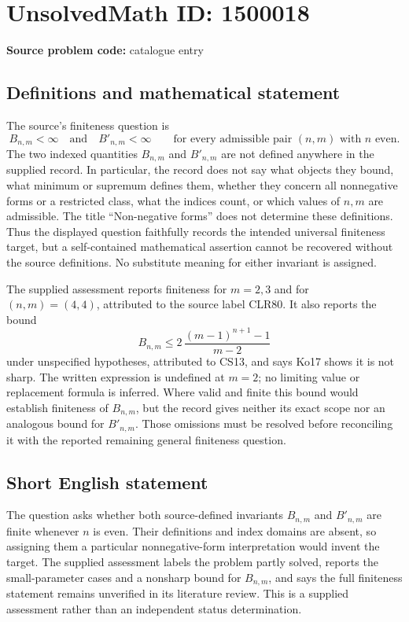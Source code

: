 \documentclass[11pt]{article}
\begin{document}
\section*{UnsolvedMath ID: 1500018}
\textbf{Source problem code:} catalogue entry
\subsection{Definitions and mathematical statement}
The source's finiteness question is
\[
 B_{n,m}<\infty\quad\text{and}\quad B'_{n,m}<\infty
 \qquad\text{for every admissible pair }(n,m)\text{ with }n\text{ even}.
\]
The two indexed quantities $B_{n,m}$ and $B'_{n,m}$ are not defined anywhere in the supplied record. In particular, the record does not say what objects they bound, what minimum or supremum defines them, whether they concern all nonnegative forms or a restricted class, what the indices count, or which values of $n,m$ are admissible. The title ``Non-negative forms'' does not determine these definitions. Thus the displayed question faithfully records the intended universal finiteness target, but a self-contained mathematical assertion cannot be recovered without the source definitions. No substitute meaning for either invariant is assigned.

The supplied assessment reports finiteness for $m=2,3$ and for $(n,m)=(4,4)$, attributed to the source label CLR80. It also reports the bound
\[
 B_{n,m}\leq 2\,\frac{(m-1)^{n+1}-1}{m-2}
\]
under unspecified hypotheses, attributed to CS13, and says Ko17 shows it is not sharp. The written expression is undefined at $m=2$; no limiting value or replacement formula is inferred. Where valid and finite this bound would establish finiteness of $B_{n,m}$, but the record gives neither its exact scope nor an analogous bound for $B'_{n,m}$. Those omissions must be resolved before reconciling it with the reported remaining general finiteness question.
\subsection{Short English statement}
The question asks whether both source-defined invariants $B_{n,m}$ and $B'_{n,m}$ are finite whenever $n$ is even. Their definitions and index domains are absent, so assigning them a particular nonnegative-form interpretation would invent the target. The supplied assessment labels the problem partly solved, reports the small-parameter cases and a nonsharp bound for $B_{n,m}$, and says the full finiteness statement remains unverified in its literature review. This is a supplied assessment rather than an independent status determination.
\end{document}

